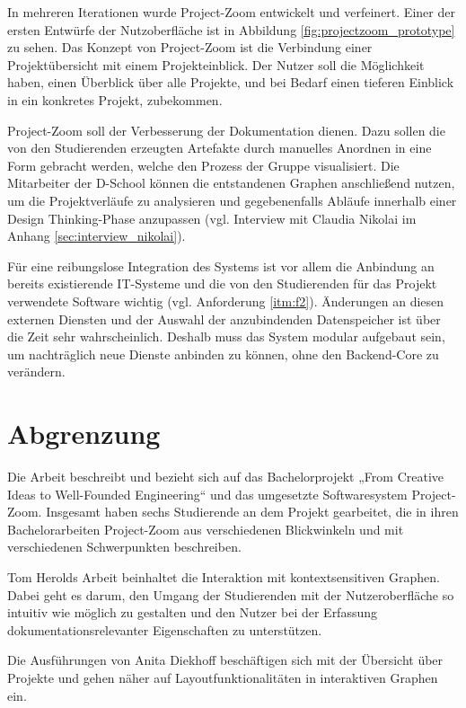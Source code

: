 In mehreren Iterationen wurde Project-Zoom entwickelt und verfeinert. Einer der ersten Entwürfe der Nutzoberfläche ist in Abbildung \ref{fig:projectzoom_prototype} zu sehen. Das Konzept von Project-Zoom ist die Verbindung einer Projektübersicht mit einem Projekteinblick. Der Nutzer soll die Möglichkeit haben, einen Überblick über alle Projekte, und bei Bedarf einen tieferen Einblick in ein konkretes Projekt, zubekommen.

Project-Zoom soll der Verbesserung der Dokumentation dienen. Dazu sollen die von den Studierenden erzeugten Artefakte durch manuelles Anordnen in eine Form gebracht werden, welche den Prozess der Gruppe visualisiert. Die Mitarbeiter der D-School können die entstandenen Graphen anschließend nutzen, um die Projektverläufe zu analysieren und gegebenenfalls Abläufe innerhalb einer Design Thinking-Phase anzupassen (vgl. Interview mit Claudia Nikolai im Anhang \ref{sec:interview_nikolai}).

Für eine reibungslose Integration des Systems ist vor allem die Anbindung an bereits existierende IT-Systeme  und die von den Studierenden für das Projekt verwendete Software wichtig (vgl. Anforderung \ref{itm:f2}). Änderungen an diesen externen Diensten und der Auswahl der anzubindenden Datenspeicher ist über die Zeit sehr wahrscheinlich. Deshalb muss das System modular aufgebaut sein, um nachträglich neue Dienste anbinden zu können, ohne den Backend-Core zu verändern.

\section{Abgrenzung}
Die Arbeit beschreibt und bezieht sich auf das Bachelorprojekt „From Creative Ideas to Well-Founded Engineering“ und das umgesetzte Softwaresystem Project-Zoom. Insgesamt haben sechs Studierende an dem Projekt gearbeitet, die in ihren Bachelorarbeiten Project-Zoom aus verschiedenen Blickwinkeln und mit verschiedenen Schwerpunkten beschreiben.

Tom Herolds Arbeit \cite{bp-tomh} beinhaltet die Interaktion mit kontextsensitiven Graphen. Dabei geht es darum, den Umgang der Studierenden mit der Nutzeroberfläche so intuitiv wie möglich zu gestalten und den Nutzer bei der Erfassung dokumentationsrelevanter Eigenschaften zu unterstützen.

Die Ausführungen von Anita Diekhoff \cite{bp-anita}  beschäftigen sich mit der Übersicht über Projekte und gehen näher auf Layoutfunktionalitäten in interaktiven Graphen ein.

